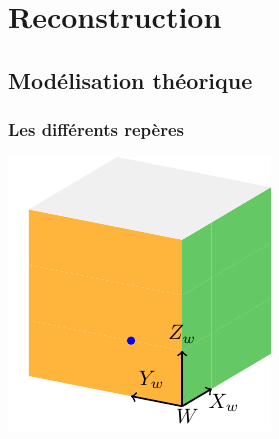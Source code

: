 \section[Reconstruction]{Reconstruction}
\subsection{Modélisation théorique}

\begin{frame}
\frametitle{Les différents repères}

\begin{minipage}{0.48\textwidth}
    \centering
    \includegraphics[width=\linewidth]{capture/cube_tikz.pdf}
    \vspace{0.5em}
    

\end{minipage}
\end{frame}
